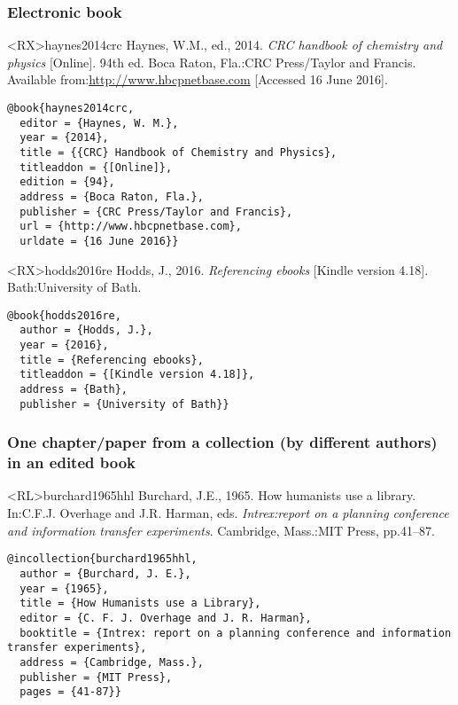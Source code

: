 \documentclass[10pt,a4paper]{article}
\begin{document}
\subsubsection*{Electronic book}

\begin{bibexbox}<RX>{haynes2014crc}
  Haynes, W.M., ed.\@, 2014. \emph{CRC handbook of chemistry and physics} [Online]. 94th ed. Boca Raton, Fla.:\@ CRC Press/Taylor and Francis. Available from:\@ \url{http://www.hbcpnetbase.com} [Accessed 16 June 2016].
  \tcblower
\begin{Verbatim}
@book{haynes2014crc,
  editor = {Haynes, W. M.},
  year = {2014},
  title = {{CRC} Handbook of Chemistry and Physics},
  titleaddon = {[Online]},
  edition = {94},
  address = {Boca Raton, Fla.},
  publisher = {CRC Press/Taylor and Francis},
  url = {http://www.hbcpnetbase.com},
  urldate = {16 June 2016}}
\end{Verbatim}
\end{bibexbox}

\begin{bibexbox}<RX>{hodds2016re}
  Hodds, J., 2016. \emph{Referencing ebooks} [Kindle version 4.18]. Bath:\@ University of Bath.
  \tcblower
\begin{Verbatim}
@book{hodds2016re,
  author = {Hodds, J.},
  year = {2016},
  title = {Referencing ebooks},
  titleaddon = {[Kindle version 4.18]},
  address = {Bath},
  publisher = {University of Bath}}
\end{Verbatim}
\end{bibexbox}

\subsubsection*{One chapter\slash paper from a collection (by different authors) in an edited book}

\begin{bibexbox}<RL>{burchard1965hhl}
  Burchard, J.E., 1965. How humanists use a library. In:\@ C.F.J. Overhage and J.R. Harman, eds. \emph{Intrex:\@ report on a planning conference and information transfer experiments}. Cambridge, Mass.:\@ MIT Press, pp.41--87.
  \tcblower
\begin{Verbatim}
@incollection{burchard1965hhl,
  author = {Burchard, J. E.},
  year = {1965},
  title = {How Humanists use a Library},
  editor = {C. F. J. Overhage and J. R. Harman},
  booktitle = {Intrex: report on a planning conference and information transfer experiments},
  address = {Cambridge, Mass.},
  publisher = {MIT Press},
  pages = {41-87}}
\end{Verbatim}
\end{bibexbox}
\end{document}
